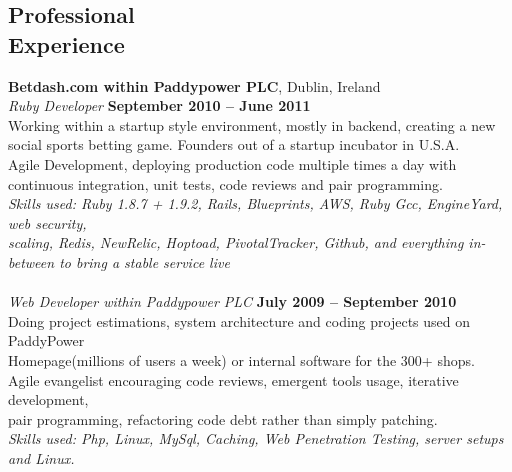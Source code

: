 \documentclass[margin,line]{resume}
\begin{document}
\begin{resume}
    \section{\mysidestyle Professional\\Experience}
    \textbf{Betdash.com within Paddypower PLC}, Dublin, Ireland \vspace{2mm}\\\vspace{1mm}%
    \textsl{Ruby Developer} \hfill \textbf{September 2010 -- June 2011}\\
    Working within a startup style environment, mostly in backend, creating a new social sports betting game. Founders out of a startup incubator in U.S.A. \vspace{1mm}\\%
    Agile Development, deploying production code multiple times a day with continuous integration, unit tests, code reviews and pair programming. \vspace{1mm} \vspace{1mm}\\%
    \textsl{Skills used: Ruby 1.8.7 + 1.9.2, Rails, Blueprints, AWS, Ruby Gcc, EngineYard, web security, \\scaling, Redis, NewRelic, Hoptoad, PivotalTracker, Github, and everything in-between to bring a stable service live  } \vspace{1mm} \\
    \\ \textsl{Web Developer within Paddypower PLC} \hfill \textbf{July 2009 -- September 2010}\\
    Doing project estimations, system architecture and coding projects used on PaddyPower \\ Homepage(millions of users a week) or internal software for the 300+ shops. \vspace{1mm}\\%
    Agile evangelist encouraging code reviews, emergent tools usage, iterative development, \\ pair programming, refactoring code debt rather than simply patching. \vspace{1mm}\\%
    \textsl{Skills used: Php, Linux, MySql, Caching, Web Penetration Testing, server setups and Linux. } \vspace{1mm}\\%


\end{resume}
\end{document}
